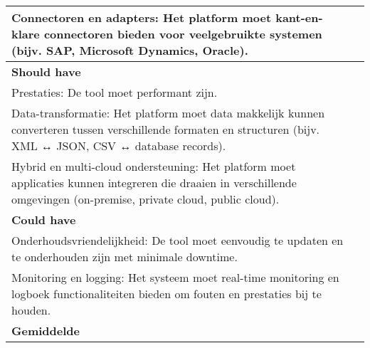 \begin{table}[htbp]
{\begin{tabular}{|ll|}
    \multicolumn{1}{|l|}{Connectoren en adapters: Het platform moet kant-en-klare connectoren bieden voor veelgebruikte systemen (bijv. SAP, Microsoft Dynamics, Oracle).}                                                     &                              \\ \hline
    \textbf{Should have}                                                                                                                                                                                                       &                              \\ \hline
    \multicolumn{1}{|l|}{Prestaties: De tool moet performant zijn.}                                                                                                                                                            &                              \\ \hline
    \multicolumn{1}{|l|}{Data-transformatie: Het platform moet data makkelijk kunnen converteren tussen verschillende formaten en structuren (bijv. XML ↔ JSON, CSV ↔ database records).}                                      &                              \\ \hline
    \multicolumn{1}{|l|}{Hybrid en multi-cloud ondersteuning: Het platform moet applicaties kunnen integreren die draaien in verschillende omgevingen (on-premise, private cloud, public cloud).}                              &                              \\ \hline
    \textbf{Could have}                                                                                                                                                                                                        &                              \\ \hline
    \multicolumn{1}{|l|}{Onderhoudsvriendelijkheid: De tool moet eenvoudig te updaten en te onderhouden zijn met minimale downtime.}                                                                                           &                              \\ \hline
    \multicolumn{1}{|l|}{Monitoring en logging: Het systeem moet real-time monitoring en logboek functionaliteiten bieden om fouten en prestaties bij te houden.}                                                              &                              \\ \hline
    \multicolumn{1}{|l|}{\textbf{Gemiddelde}}                                                                                                                                                                                  &                              \\ \hline

\end{tabular}}
\end{table}
